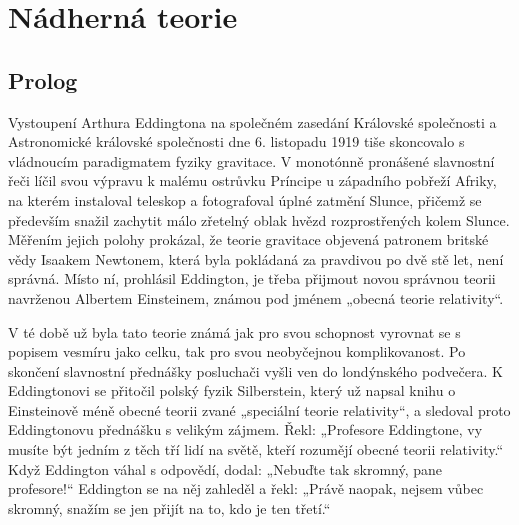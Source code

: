 \setchaptertoc
\chapter{Nádherná teorie}\label{kulIchIII}
\section{Prolog}\label{kulIchIIIsecI}
  Vystoupení Arthura Eddingtona na společném zasedání Královské společnosti a Astronomické královské
  společnosti dne 6. listopadu 1919 tiše skoncovalo s vládnoucím paradigmatem fyziky gravitace. V
  monotónně pronášené slavnostní řeči líčil svou výpravu k malému ostrůvku Príncipe u západního
  pobřeží Afriky, na kterém instaloval teleskop a fotografoval úplné zatmění Slunce, přičemž se
  především snažil zachytit málo zřetelný oblak hvězd rozprostřených kolem Slunce. Měřením jejich
  polohy prokázal, že teorie gravitace objevená patronem britské vědy Isaakem Newtonem, která byla
  pokládaná za pravdivou po dvě stě let, není správná. Místo ní, prohlásil Eddington, je třeba
  přijmout novou správnou teorii navrženou Albertem Einsteinem, známou pod jménem „obecná teorie
  relativity“. 

  V té době už byla tato teorie známá jak pro svou schopnost vyrovnat se s popisem vesmíru jako
  celku, tak pro svou neobyčejnou komplikovanost. Po skončení slavnostní přednášky posluchači vyšli
  ven do londýnského podvečera. K Eddingtonovi se přitočil polský fyzik Silberstein, který už napsal
  knihu o Einsteinově méně obecné teorii zvané „speciální teorie relativity“, a sledoval proto
  Eddingtonovu přednášku s velikým zájmem. Řekl: „Profesore Eddingtone, vy musíte být jedním z těch
  tří lidí na světě, kteří rozumějí obecné teorii relativity.“ Když Eddington váhal s odpovědí,
  dodal: „Nebuďte tak skromný, pane profesore!“ Eddington se na něj zahleděl a řekl: „Právě naopak,
  nejsem vůbec skromný, snažím se jen přijít na to, kdo je ten třetí.“ 

